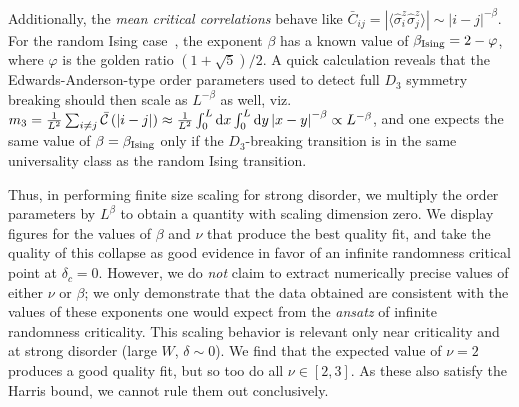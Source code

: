 \documentclass[prb,aps, twocolumn, superscriptaddress]{revtex4-1}
\newcommand{\expval}[1]{ \langle #1 \rangle}
\def\ket#1{{|#1\rangle}}
\def\bra#1{{\langle #1 |}}
\begin{document}
Additionally, the \emph{mean critical correlations} behave like $\bar{C}_{ij} = \left| \expval{\hat{\sigma}^z_i \hat{\sigma}^z_j} \right| \sim \left| i - j \right|^{-\beta }$. For the random Ising case~\cite{FisherRSRG1,FisherRSRG2}, the exponent $\beta$ has a known value of $\beta_{\rm Ising} = 2-\varphi  $, where $\varphi$ is the golden ratio $\left(1+ \sqrt{5} \right)/2$. A quick calculation reveals that the Edwards-Anderson-type order parameters used to detect full $D_3$ symmetry breaking should then scale as $L^{-\beta}$ as well, viz. 
$m_3 = \frac{1}{L^2} \sum_{i\neq j} \bar{\mathcal{C}} \left(\left|i-j\right| \right)\approx \frac{1}{L^2} \int_0^L {\rm d}x \int_0^L {\rm d} y \left| x - y \right|^{-\beta} \propto  L^{-\beta}$, and one expects the same value of $\beta= \beta_{\rm Ising}$ only if the $D_3$-breaking transition is in the same universality class as the random Ising transition.

Thus, in performing finite size scaling for strong disorder, we multiply the order parameters by $L^{\beta}$ to obtain a quantity with scaling dimension zero. We display figures for the values of $\beta$ and $\nu$ that produce the best quality fit, and take the quality of this collapse as good evidence in favor of an infinite randomness critical point at $\delta_c = 0$. However, we do \emph{not} claim to extract numerically precise values of either $\nu$ or $\beta$; we only demonstrate that the data obtained are consistent with the values of these exponents one would expect from the {\it ansatz} of infinite randomness criticality. This scaling behavior is relevant only near criticality and at strong disorder (large $W$, $\delta \sim 0$). We find that the expected value of $\nu = 2$ produces a good quality fit, but so too do all $\nu \in [2,3]$. As these also satisfy the Harris bound, we cannot rule them out conclusively. 

 
\end{document}
